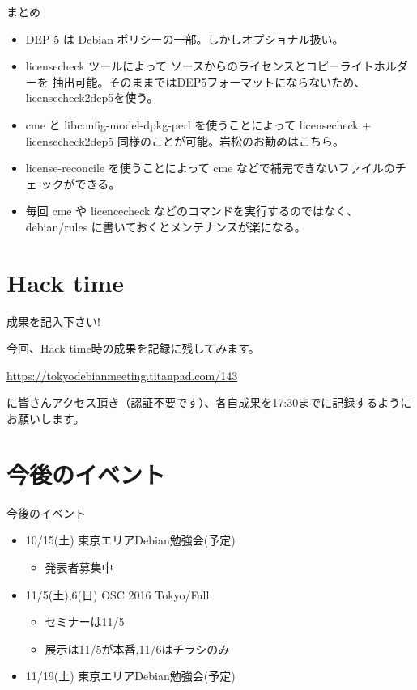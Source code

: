 \begin{frame}{まとめ}

\begin{itemize}
\item DEP 5 は Debian ポリシーの一部。しかしオプショナル扱い。
\item licensecheck ツールによって ソースからのライセンスとコピーライトホルダーを
抽出可能。そのままではDEP5フォーマットにならないため、licensecheck2dep5を使う。
\item cme と libconfig-model-dpkg-perl を使うことによって licensecheck +
licensecheck2dep5 同様のことが可能。岩松のお勧めはこちら。
\item license-reconcile を使うことによって cme などで補完できないファイルのチェ
ックができる。
\item 毎回 cme や licencecheck などのコマンドを実行するのではなく、debian/rules 
に書いておくとメンテナンスが楽になる。
\end{itemize}

\end{frame}

\section{Hack time}

\begin{frame}{成果を記入下さい!}

  今回、Hack time時の成果を記録に残してみます。

\url{https://tokyodebianmeeting.titanpad.com/143}

に皆さんアクセス頂き（認証不要です）、各自成果を17:30までに記録するようにお願いします。

\end{frame}
  
\section{今後のイベント}
\begin{frame}{今後のイベント}
\begin{itemize}
\item 10/15(土) 東京エリアDebian勉強会(予定)
  \begin{itemize}
  \item 発表者募集中
  \end{itemize}
\item 11/5(土),6(日) OSC 2016 Tokyo/Fall
  \begin{itemize}
  \item セミナーは11/5
  \item 展示は11/5が本番,11/6はチラシのみ
  \end{itemize}
\item 11/19(土) 東京エリアDebian勉強会(予定)
\end{itemize}
\end{frame}



